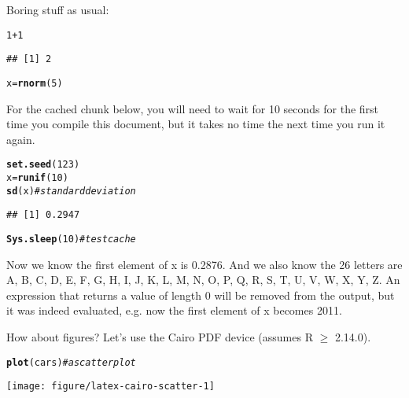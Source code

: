 \documentclass{article}\usepackage[]{graphicx}\usepackage[]{xcolor}
\makeatletter
\newcommand{\hlnum}[1]{\textcolor[rgb]{0.686,0.059,0.569}{#1}}%
\newcommand{\hlcom}[1]{\textcolor[rgb]{0.678,0.584,0.686}{\textit{#1}}}%
\newcommand{\hlopt}[1]{\textcolor[rgb]{0,0,0}{#1}}%
\newcommand{\hlstd}[1]{\textcolor[rgb]{0.345,0.345,0.345}{#1}}%
\newcommand{\hlkwb}[1]{\textcolor[rgb]{0.69,0.353,0.396}{#1}}%
\newcommand{\hlkwd}[1]{\textcolor[rgb]{0.737,0.353,0.396}{\textbf{#1}}}%
\newenvironment{kframe}{%
 \def\at@end@of@kframe{}%
 \ifinner\ifhmode%
  \def\at@end@of@kframe{\end{minipage}}%
  \begin{minipage}{\columnwidth}%
 \fi\fi%
 \def\FrameCommand##1{\hskip\@totalleftmargin \hskip-\fboxsep
 \colorbox{shadecolor}{##1}\hskip-\fboxsep
     \hskip-\linewidth \hskip-\@totalleftmargin \hskip\columnwidth}%
 \MakeFramed {\advance\hsize-\width
   \@totalleftmargin\z@ \linewidth\hsize
   \@setminipage}}%
 {\par\unskip\endMakeFramed%
 \at@end@of@kframe}
\newenvironment{knitrout}{}{} %
\makeatother
\begin{document}
Boring stuff as usual:

\begin{knitrout}
\color{fgcolor}\begin{kframe}
\begin{alltt}
\hlnum{1} \hlopt{+} \hlnum{1}
\end{alltt}
\begin{verbatim}
## [1] 2
\end{verbatim}
\begin{alltt}
\hlstd{x} \hlkwb{=} \hlkwd{rnorm}\hlstd{(}\hlnum{5}\hlstd{)}
\end{alltt}
\end{kframe}
\end{knitrout}

For the cached chunk below, you will need to wait for 10 seconds for
the first time you compile this document, but it takes no time the
next time you run it again.

\begin{knitrout}
\color{fgcolor}\begin{kframe}
\begin{alltt}
\hlkwd{set.seed}\hlstd{(}\hlnum{123}\hlstd{)}
\hlstd{x} \hlkwb{=} \hlkwd{runif}\hlstd{(}\hlnum{10}\hlstd{)}
\hlkwd{sd}\hlstd{(x)}  \hlcom{# standard deviation}
\end{alltt}
\begin{verbatim}
## [1] 0.2947
\end{verbatim}
\begin{alltt}
\hlkwd{Sys.sleep}\hlstd{(}\hlnum{10}\hlstd{)}  \hlcom{# test cache}
\end{alltt}
\end{kframe}
\end{knitrout}

Now we know the first element of x is 0.2876. And we also know
the 26 letters are A, B, C, D, E, F, G, H, I, J, K, L, M, N, O, P, Q, R, S, T, U, V, W, X, Y, Z. An expression that returns a
value of length 0 will be removed from the output,  but it was indeed evaluated, e.g. now the first element
of x becomes 2011.

How about figures? Let's use the Cairo PDF device (assumes R $\geq$
2.14.0).

\begin{knitrout}
\color{fgcolor}\begin{kframe}
\begin{alltt}
\hlkwd{plot}\hlstd{(cars)}  \hlcom{# a scatter plot}
\end{alltt}
\end{kframe}
\texttt{[image: figure/latex-cairo-scatter-1]} 
\end{knitrout}
\end{document}
